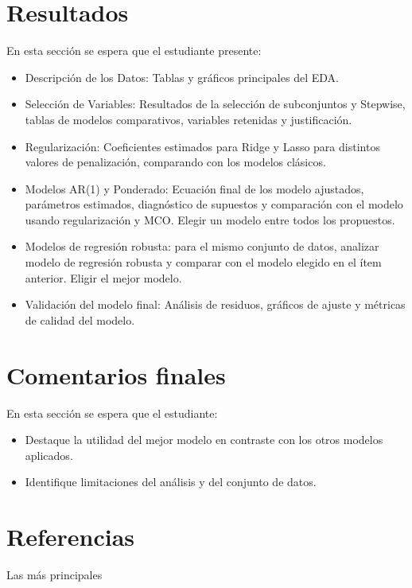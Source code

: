 \documentclass[12pt]{article}
\begin{document}
\section{Resultados}
En esta sección se espera que el estudiante presente:
\begin{itemize}
    \item Descripción de los Datos: Tablas y gráficos principales del EDA.  
    \item Selección de Variables: Resultados de la selección de subconjuntos y Stepwise, tablas de modelos comparativos, variables retenidas y justificación.  
    \item Regularización: Coeficientes estimados para Ridge y Lasso para distintos valores de penalización, comparando con los modelos clásicos.
    \item Modelos AR(1) y Ponderado: Ecuación final de los modelo ajustados, parámetros estimados, diagnóstico de supuestos y comparación con el modelo usando regularización y MCO. Elegir un modelo entre todos los propuestos.
    \item Modelos de regresión robusta: para el mismo conjunto de datos, analizar modelo de regresión robusta y comparar con el modelo elegido en el ítem anterior. Eligir el mejor modelo.
    \item Validación del modelo final: Análisis de residuos, gráficos de ajuste y métricas de calidad del modelo.
\end{itemize}

\section{Comentarios finales}
En esta sección se espera que el estudiante:
\begin{itemize}
    \item Destaque la utilidad del mejor modelo en contraste con los otros modelos aplicados.
    \item Identifique limitaciones del análisis y del conjunto de datos. 
\end{itemize}



\section*{Referencias}

Las más principales
\end{document}
